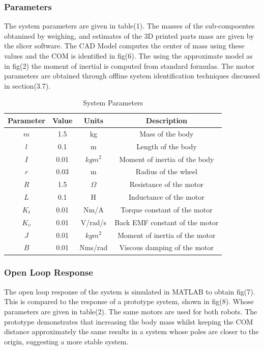         \subsubsection{Parameters}
        The system parameters are given in table(1). 
        The masses of the sub-compoentes obtanined by weighing,
        and estimates of the 3D printed parts mass are given by the slicer software. 
        The CAD Model computes the center of mass using these values and the COM is identified in fig(6).
        The using the approximate model as in fig(2) the moment of inertial is computed from standard formulas.
        The motor parameters are obtained through offline system identification techniques
        discussed in section(3.7). 
        \begin{table} [H]
            \centering
            \begin{tabular}{|c|c|c|c|}
                \hline
                Parameter & Value & Units & Description \\
                \hline
                $m$ & 1.5 & kg & Mass of the body \\
                $l$ & 0.1 & m & Length of the body \\
                $I$ & 0.01 & $kgm^2$ & Moment of inertia of the body \\
                $r$ & 0.03 & m & Radius of the wheel \\
                $R$ & 1.5 & $\Omega$ & Resistance of the motor \\
                $L$ & 0.1 & H & Inductance of the motor \\
                $K_t$ & 0.01 & Nm/A & Torque constant of the motor \\
                $K_v$ & 0.01 & V/rad/s & Back EMF constant of the motor \\
                $J$ & 0.01 & $kgm^2$ & Moment of inertia of the motor \\
                $B$ & 0.01 & Nms/rad & Viscous damping of the motor \\
                \hline
            \end{tabular}
            \caption{System Parameters}
        \end{table}

        \subsubsection{Open Loop Response}
        The open loop response of the system is simulated in MATLAB to obtain fig(7).
        This is compared to the response of a prototype system, shown in fig(8). 
        Whose parameters are given in table(2). The same motors are used for both robots.
        The prototype demonstrates that increasing the body mass whilst keeping the COM 
        distance approximately the same results in a system whose poles are closer to the origin, 
        suggesting a more stable system.
        

